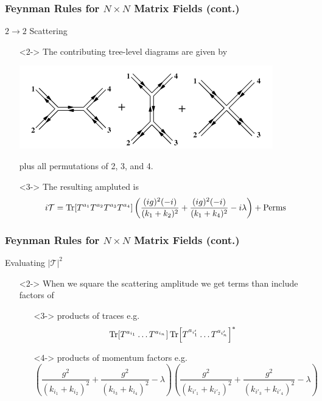 \documentclass{beamer}
\begin{document}
\begin{frame}
    \frametitle{Feynman Rules for $N\times N$ Matrix Fields (cont.)}
    \alert{$2 \to 2$ Scattering}
    \begin{itemize}
        \item[\textbullet]<2-> The contributing tree-level diagrams are given by
        \begin{center}
            \includegraphics[scale=0.65]{tree_level.PNG}
        \end{center}
        plus all permutations of 2, 3, and 4.
        \item[\textbullet]<3-> The resulting ampluted is \[ i\mathcal{T} = \Tr[T^{a_1}T^{a_2}T^{a_3}T^{a_4}]\left(\frac{(ig)^2(-i)}{(k_1 + k_2)^2} + \frac{(ig)^2(-i)}{(k_1 + k_4)^2} - i\lambda\right) + \text{Perms} \]
    \end{itemize}
\end{frame}

\begin{frame}
    \frametitle{Feynman Rules for $N\times N$ Matrix Fields (cont.)}
    \alert{Evaluating $|\mathcal{T}|^2$}
    \begin{itemize}
        \item[\textbullet]<2-> When we square the scattering amplitude we get terms than include factors of
        \begin{itemize}
            \item[\textbullet]<3-> products of traces e.g. \[ \Tr[T^{a_{i_1}}\ldots T^{a_{i_n}}]\Tr[T^{a_{i'_1}}\ldots T^{a_{i'_n}}]^* \]
            \item[\textbullet]<4-> products of momentum factors e.g. \[ \left(\frac{g^2}{(k_{i_1}+k_{i_2})^2} + \frac{g^2}{(k_{i_3}+k_{i_4})^2} - \lambda\right)\left(\frac{g^2}{(k_{i'_1}+k_{i'_2})^2} + \frac{g^2}{(k_{i'_3}+k_{i'_4})^2} - \lambda\right) \]
        \end{itemize}
    \end{itemize}
\end{frame}
\end{document}

